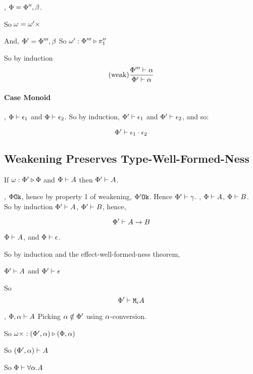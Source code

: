 {    \bi, $\Phi = \Phi'', \beta$.

    So $\omega = \omega'\times$

    And, $\Phi' = \Phi''', \beta$
    So \bi $\omega' : \Phi''' \triangleright \pi_1''$

    So by induction
    \begin{equation}
        (\text{weak}) \frac{\Phi'''\vdash \alpha}{\Phi'\vdash \alpha}
    \end{equation}


    \paragraph{Case Monoid}

    \bi, $\Phi\vdash \epsilon_1$ and $\Phi\vdash \epsilon_2$. So by induction,
    $\Phi'\vdash \epsilon_1$ and $\Phi'\vdash \epsilon_2$, and so:

    \begin{equation}
        \Phi'\vdash \epsilon_1\cdot\epsilon_2
    \end{equation}
    \subsection{Weakening Preserves Type-Well-Formed-Ness}

    If $\omega : \Phi' \triangleright \Phi$ and $\Phi\vdash A$ then $\Phi'\vdash A$.

    \proof
    \bi, $\Phi \texttt{Ok}$, hence by property 1 of weakening, $\Phi' \texttt{Ok}$. Hence $\Phi'\vdash \gamma$.
    \bi, $\Phi\vdash A$, $\Phi\vdash B$.
    So by induction $\Phi'\vdash A$, $\Phi'\vdash B$, hence,

    $$\Phi'\vdash A\rightarrow B$$


    \bi $\Phi\vdash A$, and $\Phi\vdash \epsilon$.

    So by induction and the effect-well-formed-ness theorem, 

    $\Phi'\vdash A$ and $\Phi'\vdash \epsilon$

    So $$\Phi'\vdash \texttt{M}_{\epsilon}{A}$$

    \bi, $\Phi,\alpha\vdash A$
    Picking $\alpha\notin\Phi'$ using $\alpha$-conversion.

    So $\omega\times : (\Phi', \alpha) \triangleright (\Phi, \alpha)$

    So $(\Phi', \alpha)\vdash A$

    So $\Phi\vdash \forall \alpha. A$

}

